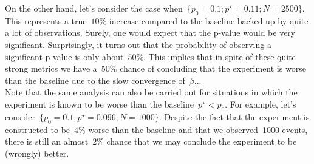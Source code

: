 \documentclass{article}
\begin{document}
\noindent On the other hand, let's consider the case when~$\{ p_0 = 0.1 ; p^{\star} = 0.11 ; N = 2500 \}$.  This represents a true~$10\%$ increase compared to the baseline backed up by quite a lot of observations.  Surely, one would expect that the p-value would be very significant.  Surprisingly, it turns out that the probability of observing a significant p-value is only about~$50\%$.  This implies that in spite of these quite strong metrics we have a~$50\%$ chance of concluding that the experiment is worse than the baseline due to the slow convergence of~$\beta$... \\

\noindent Note that the same analysis can also be carried out for situations in which the experiment is known to be worse than the baseline~$p^{\star} < p_0$.  For example, let's consider~$\{ p_0 = 0.1 ; p^{\star} = 0.096 ; N = 1000 \}$.  Despite the fact that the experiment is constructed to be~$4\%$ worse than the baseline and that we observed~1000 events, there is still an almost~$2\%$ chance that we may conclude the experiment to be (wrongly) better.
\end{document}
